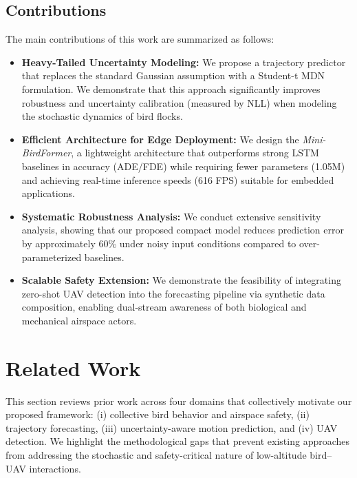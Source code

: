 \documentclass[journal]{IEEEtran}
\begin{document}
	\subsection{Contributions}
	The main contributions of this work are summarized as follows:
	\begin{itemize}
		\item \textbf{Heavy-Tailed Uncertainty Modeling:} We propose a trajectory predictor that replaces the standard Gaussian assumption with a Student-t MDN formulation. We demonstrate that this approach significantly improves robustness and uncertainty calibration (measured by NLL) when modeling the stochastic dynamics of bird flocks.
		\item \textbf{Efficient Architecture for Edge Deployment:} We design the \textit{Mini-BirdFormer}, a lightweight architecture that outperforms strong LSTM baselines \cite{Alahi2016SocialLSTM} in accuracy (ADE/FDE) while requiring fewer parameters (1.05M) and achieving real-time inference speeds (616 FPS) suitable for embedded applications.
		\item \textbf{Systematic Robustness Analysis:} We conduct extensive sensitivity analysis, showing that our proposed compact model reduces prediction error by approximately 60\% under noisy input conditions compared to over-parameterized baselines.
		\item \textbf{Scalable Safety Extension:} We demonstrate the feasibility of integrating zero-shot UAV detection into the forecasting pipeline via synthetic data composition, enabling dual-stream awareness of both biological and mechanical airspace actors.
	\end{itemize}
	
\section{Related Work}
\label{sec:related}

This section reviews prior work across four domains that collectively motivate our proposed framework: (i) collective bird behavior and airspace safety, (ii) trajectory forecasting, (iii) uncertainty-aware motion prediction, and (iv) UAV detection. We highlight the methodological gaps that prevent existing approaches from addressing the stochastic and safety-critical nature of low-altitude bird–UAV interactions.
\end{document}
